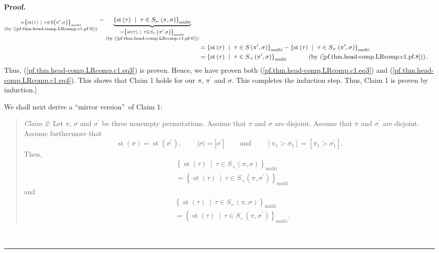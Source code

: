 \documentclass[numbers=enddot,12pt,final,onecolumn,notitlepage]{scrartcl}%
\theoremstyle{definition}
\newenvironment{statement}{\begin{quote}}{\end{quote}}
\newenvironment{proof}[1][Proof]{\noindent\textbf{#1.} }{\ \rule{0.5em}{0.5em}}
\begin{document}
\begin{proof}
\begin{align*}
{}_{\substack{=\left\{  \operatorname*{st}\left(  \tau\right)  \ \mid\ \tau\in
S\left(  \pi^{\prime},\sigma\right)  \right\}  _{\operatorname*{multi}%
}\\\text{(by (\ref{pf.thm.head-comp.LRcomp.c1.pf.9}))}}}-\underbrace{\left\{
\operatorname*{st}\left(  \tau\right)  \ \mid\ \tau\in S_{\succ}\left(
\pi,\sigma\right)  \right\}  _{\operatorname*{multi}}}_{\substack{=\left\{
\operatorname*{st}\left(  \tau\right)  \ \mid\ \tau\in S_{\succ}\left(
\pi^{\prime},\sigma\right)  \right\}  _{\operatorname*{multi}}\\\text{(by
(\ref{pf.thm.head-comp.LRcomp.c1.pf.6}))}}}\\
&  =\left\{  \operatorname*{st}\left(  \tau\right)  \ \mid\ \tau\in S\left(
\pi^{\prime},\sigma\right)  \right\}  _{\operatorname*{multi}}-\left\{
\operatorname*{st}\left(  \tau\right)  \ \mid\ \tau\in S_{\succ}\left(
\pi^{\prime},\sigma\right)  \right\}  _{\operatorname*{multi}}\\
&  =\left\{  \operatorname*{st}\left(  \tau\right)  \ \mid\ \tau\in S_{\prec
}\left(  \pi^{\prime},\sigma\right)  \right\}  _{\operatorname*{multi}%
}\ \ \ \ \ \ \ \ \ \ \left(  \text{by (\ref{pf.thm.head-comp.LRcomp.c1.pf.8}%
)}\right)  .
\end{align*}
Thus, (\ref{pf.thm.head-comp.LRcomp.c1.eq3}) is proven. Hence, we have proven
both (\ref{pf.thm.head-comp.LRcomp.c1.eq3}) and
(\ref{pf.thm.head-comp.LRcomp.c1.eq4}). This shows that Claim 1 holds for our
$\pi$, $\pi^{\prime}$ and $\sigma$. This completes the induction step. Thus,
Claim 1 is proven by induction.]

We shall next derive a \textquotedblleft mirror version\textquotedblright\ of
Claim 1:

\begin{statement}
\textit{Claim 2:} Let $\pi$, $\sigma$ and $\sigma^{\prime}$ be three nonempty
permutations. Assume that $\pi$ and $\sigma$ are disjoint. Assume that $\pi$
and $\sigma^{\prime}$ are disjoint. Assume furthermore that%
\[
\operatorname*{st}\left(  \sigma\right)  =\operatorname*{st}\left(
\sigma^{\prime}\right)  ,\ \ \ \ \ \ \ \ \ \ \left\vert \sigma\right\vert
=\left\vert \sigma^{\prime}\right\vert \ \ \ \ \ \ \ \ \ \ \text{and}%
\ \ \ \ \ \ \ \ \ \ \left[  \pi_{1}>\sigma_{1}\right]  =\left[  \pi_{1}%
>\sigma_{1}^{\prime}\right]  .
\]
Then,
\begin{align*}
&  \left\{  \operatorname*{st}\left(  \tau\right)  \ \mid\ \tau\in S_{\prec
}\left(  \pi,\sigma\right)  \right\}  _{\operatorname*{multi}}\\
&  =\left\{  \operatorname*{st}\left(  \tau\right)  \ \mid\ \tau\in S_{\prec
}\left(  \pi,\sigma^{\prime}\right)  \right\}  _{\operatorname*{multi}}%
\end{align*}
and%
\begin{align*}
&  \left\{  \operatorname*{st}\left(  \tau\right)  \ \mid\ \tau\in S_{\succ
}\left(  \pi,\sigma\right)  \right\}  _{\operatorname*{multi}}\\
&  =\left\{  \operatorname*{st}\left(  \tau\right)  \ \mid\ \tau\in S_{\succ
}\left(  \pi,\sigma^{\prime}\right)  \right\}  _{\operatorname*{multi}}.
\end{align*}


\end{statement}
\end{proof}
\end{document}

